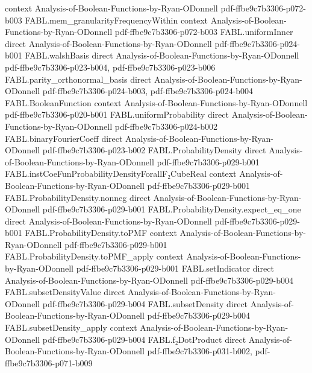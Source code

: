 \begin{theorem}
  {context}
  {Analysis-of-Boolean-Functions-by-Ryan-ODonnell}
  {pdf-ffbe9c7b3306-p072-b003}
\proofstep
  {FABL.mem_granularityFrequencyWithin}
  {context}
  {Analysis-of-Boolean-Functions-by-Ryan-ODonnell}
  {pdf-ffbe9c7b3306-p072-b003}
\proofstep
  {FABL.uniformInner}
  {direct}
  {Analysis-of-Boolean-Functions-by-Ryan-ODonnell}
  {pdf-ffbe9c7b3306-p024-b001}
\proofstep
  {FABL.walshBasis}
  {direct}
  {Analysis-of-Boolean-Functions-by-Ryan-ODonnell}
  {pdf-ffbe9c7b3306-p023-b004,
    pdf-ffbe9c7b3306-p023-b006}
\proofstep
  {FABL.parity_orthonormal_basis}
  {direct}
  {Analysis-of-Boolean-Functions-by-Ryan-ODonnell}
  {pdf-ffbe9c7b3306-p024-b003,
    pdf-ffbe9c7b3306-p024-b004}
\proofstep
  {FABL.BooleanFunction}
  {context}
  {Analysis-of-Boolean-Functions-by-Ryan-ODonnell}
  {pdf-ffbe9c7b3306-p020-b001}
\proofstep
  {FABL.uniformProbability}
  {direct}
  {Analysis-of-Boolean-Functions-by-Ryan-ODonnell}
  {pdf-ffbe9c7b3306-p024-b002}
\proofstep
  {FABL.binaryFourierCoeff}
  {direct}
  {Analysis-of-Boolean-Functions-by-Ryan-ODonnell}
  {pdf-ffbe9c7b3306-p023-b002}
\proofstep
  {FABL.ProbabilityDensity}
  {direct}
  {Analysis-of-Boolean-Functions-by-Ryan-ODonnell}
  {pdf-ffbe9c7b3306-p029-b001}
\proofstep
  {FABL.instCoeFunProbabilityDensityForallF₂CubeReal}
  {context}
  {Analysis-of-Boolean-Functions-by-Ryan-ODonnell}
  {pdf-ffbe9c7b3306-p029-b001}
\proofstep
  {FABL.ProbabilityDensity.nonneg}
  {direct}
  {Analysis-of-Boolean-Functions-by-Ryan-ODonnell}
  {pdf-ffbe9c7b3306-p029-b001}
\proofstep
  {FABL.ProbabilityDensity.expect_eq_one}
  {direct}
  {Analysis-of-Boolean-Functions-by-Ryan-ODonnell}
  {pdf-ffbe9c7b3306-p029-b001}
\proofstep
  {FABL.ProbabilityDensity.toPMF}
  {context}
  {Analysis-of-Boolean-Functions-by-Ryan-ODonnell}
  {pdf-ffbe9c7b3306-p029-b001}
\proofstep
  {FABL.ProbabilityDensity.toPMF_apply}
  {context}
  {Analysis-of-Boolean-Functions-by-Ryan-ODonnell}
  {pdf-ffbe9c7b3306-p029-b001}
\proofstep
  {FABL.setIndicator}
  {direct}
  {Analysis-of-Boolean-Functions-by-Ryan-ODonnell}
  {pdf-ffbe9c7b3306-p029-b004}
\proofstep
  {FABL.subsetDensityValue}
  {direct}
  {Analysis-of-Boolean-Functions-by-Ryan-ODonnell}
  {pdf-ffbe9c7b3306-p029-b004}
\proofstep
  {FABL.subsetDensity}
  {direct}
  {Analysis-of-Boolean-Functions-by-Ryan-ODonnell}
  {pdf-ffbe9c7b3306-p029-b004}
\proofstep
  {FABL.subsetDensity_apply}
  {context}
  {Analysis-of-Boolean-Functions-by-Ryan-ODonnell}
  {pdf-ffbe9c7b3306-p029-b004}
\proofstep
  {FABL.f₂DotProduct}
  {direct}
  {Analysis-of-Boolean-Functions-by-Ryan-ODonnell}
  {pdf-ffbe9c7b3306-p031-b002,
    pdf-ffbe9c7b3306-p071-b009}

\end{theorem}
